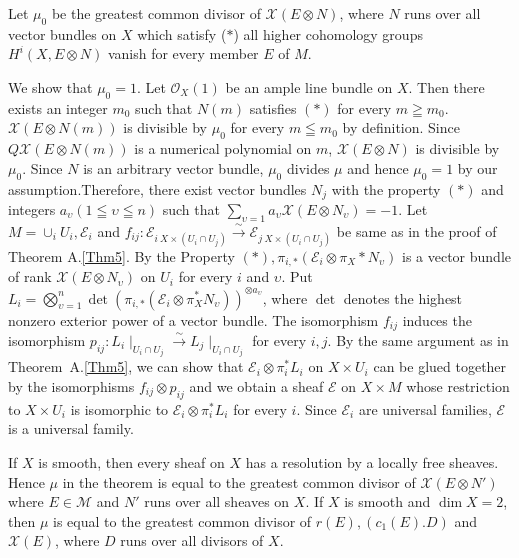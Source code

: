 \begin{Proof}
Let $\mu_0$ be the greatest common divisor of $\mathcal{X}(E\otimes
N)$, where $N$ runs over all vector bundles on $X$ which satisfy 
($\ast$) all higher cohomology groups $H^{i}(X, E\otimes N)$ vanish
for every member $E$ of $M$. 

We show that $\mu_0=1$. Let $\mathscr{O}_X(1)$ be an ample line bundle
on $X$. Then there exists an integer $m_0$ such that $N(m)$ satisfies
$(\ast)$ for every $m\geqq m_0$. $\mathcal{X}(E\otimes N(m))$ is
divisible by $\mu_0$ for every $m\leqq m_0$ by definition. Since
$Q\mathcal{X}(E\otimes N(m))$ is a numerical polynomial on $m$,
$\mathcal{X}(E\otimes N)$ is divisible by $\mu_0$. Since $N$ is an
arbitrary vector bundle, $\mu_0$ divides $\mu$ and hence $\mu_0=1$ by
our assumption.\pageoriginale Therefore, there exist vector bundles
$N_j$ with the property $(\ast)$ and integers
$a_{\upsilon}(1\leqq \upsilon \leqq n)$ 
such that $\sum\limits_{\upsilon=1}a_{\upsilon}\mathcal{X}(E\otimes
N_{\upsilon})=-1$. Let $M=\cup_{i}U_i,\mathscr{E}_i$ and
$f_{ij}:\mathscr{E}_{i \ X\times (U_i\cap
U_j)}\xrightarrow{\sim}\mathscr{E}_{j \ X\times (U_i\cap U_j)}$ be same as
in the proof of Theorem A.\ref{Thm5}. By the Property
$(\ast),\pi_{i,\ast}(\mathscr{E}_i\otimes \pi_{X}\ast N_{\upsilon})$
is a vector bundle of rank $\mathcal{X}(E\otimes N_{\upsilon})$ on
$U_i$ for every $i$ and $\upsilon$. Put $L_i=\bigotimes\limits_{\upsilon
=1}^{n}\det(\pi_{i,\ast}(\mathscr{E}_i\otimes \pi^{\ast}_{X}N_{\upsilon}))^{\otimes
a_{\upsilon}}$, where $\det$ denotes the highest nonzero exterior power of
a vector bundle. The isomorphism $f_{ij}$ induces the isomorphism
$p_{ij}:L_{i}\mid_{U_i\cap U_j}\xrightarrow{\sim}L_j\mid_{U_i\cap
U_j}$ for every $i,j$. By the same argument as in
Theorem~A.\ref{Thm5}, we can show that
$\mathscr{E}_i\otimes \pi^{\ast}_{i}L_i$ on $X\times U_i$ can be glued
together by the isomorphisms $f_{ij}\otimes p_{ij}$ and we obtain a
sheaf $\mathscr{E}$ on $X\times M$ whose restriction to $X\times U_i$
is isomorphic to $\mathscr{E}_i\otimes \pi_i^{\ast}L_i$ for every
$i$. Since $\mathscr{E}_i$ are universal families, $\mathscr{E}$ is a
universal family.
\enprf
\end{Proof}

\setcounter{rem1}{6}
\begin{rem1}
If $X$ is smooth, then every sheaf on $X$ has a resolution by a
locally free sheaves. Hence $\mu$ in the theorem is equal to the
greatest common divisor of $\mathcal{X}(E\otimes N')$ where
$E\in \mathscr{M}$ and $N'$ runs over all sheaves on $X$. If $X$ is
smooth and $\dim X=2$, then $\mu$ is equal to the greatest common
divisor of $r(E), (c_1(E).D)$ and $\mathcal{X}(E)$, where $D$ runs
over all divisors of $X$. 
\end{rem1}

